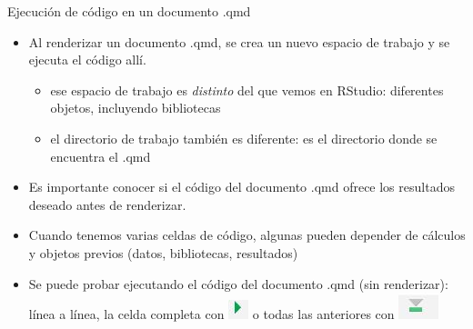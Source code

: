 \documentclass[
  10pt,
  ignorenonframetext,
]{beamer}
\providecommand{\tightlist}{%
  \setlength{\itemsep}{0pt}\setlength{\parskip}{0pt}}\usepackage{longtable,booktabs,array}
\begin{document}
\begin{frame}{Ejecución de código en un documento .qmd}
\label{ejecuciuxf3n-de-cuxf3digo-en-un-documento-.qmd}
\begin{itemize}
\item
  Al renderizar un documento .qmd, se crea un nuevo espacio de trabajo y
  se ejecuta el código allí.

  \begin{itemize}
  \item
    ese espacio de trabajo es \emph{distinto} del que vemos en RStudio:
    diferentes objetos, incluyendo bibliotecas
  \item
    el directorio de trabajo también es diferente: es el directorio
    donde se encuentra el .qmd
  \end{itemize}
\item
  Es importante conocer si el código del documento .qmd ofrece los
  resultados deseado antes de renderizar.
\item
  Cuando tenemos varias celdas de código, algunas pueden depender de
  cálculos y objetos previos (datos, bibliotecas, resultados)
\end{itemize}

\begin{itemize}
\tightlist
\item
  Se puede probar ejecutando el código del documento .qmd (sin
  renderizar): línea a línea, la celda completa con
  \includegraphics{figure/RunChunk.jpg} o todas las anteriores con
  \includegraphics{figure/RunPrevChunk.jpg}
\end{itemize}
\end{frame}
\end{document}
